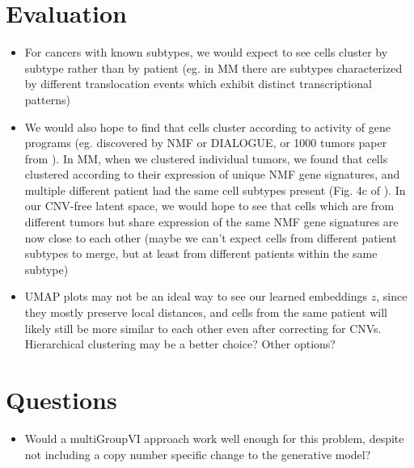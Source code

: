 \documentclass{article}
\begin{document}
\section{Evaluation}
\begin{itemize}
    \item For cancers with known subtypes, we would expect to see cells cluster by subtype rather than by patient (eg. in MM there are subtypes characterized by different translocation events which exhibit distinct transcriptional patterns)
    \item We would also hope to find that cells cluster according to activity of gene programs (eg. discovered by NMF or DIALOGUE, or 1000 tumors paper from \cite{gavish2023hallmarks}). In MM, when we clustered individual tumors, we found that cells clustered according to their expression of unique NMF gene signatures, and multiple different patient had the same cell subtypes present (Fig. 4c of \cite{boiarsky2022single}). In our CNV-free latent space, we would hope to see that cells which are from different tumors but share expression of the same NMF gene signatures are now close to each other (maybe we can't expect cells from different patient subtypes to merge, but at least from different patients within the same subtype)
    \item UMAP plots may not be an ideal way to see our learned embeddings $z$, since they mostly preserve local distances, and cells from the same patient will likely still be more similar to each other even after correcting for CNVs. Hierarchical clustering may be a better choice? Other options?
\end{itemize}

\section{Questions}
\begin{itemize}
    \item Would a multiGroupVI approach work well enough for this problem, despite not including a copy number specific change to the generative model?
\end{itemize}



\end{document}

